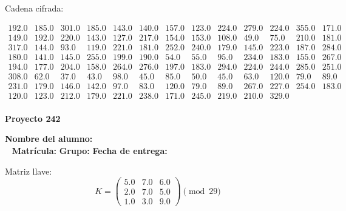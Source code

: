 \documentclass[12pt]{article}
\begin{document}
Cadena cifrada:
\begin{center}
$\begin{array}{lllllllllllll}
192.0 & 185.0 & 301.0 & 185.0 & 143.0 & 140.0 & 157.0 & 123.0 & 224.0 & 279.0 & 224.0 & 355.0 & 171.0\\
149.0 & 192.0 & 220.0 & 143.0 & 127.0 & 217.0 & 154.0 & 153.0 & 108.0 & 49.0 & 75.0 & 210.0 & 181.0\\
317.0 & 144.0 & 93.0 & 119.0 & 221.0 & 181.0 & 252.0 & 240.0 & 179.0 & 145.0 & 223.0 & 187.0 & 284.0\\
180.0 & 141.0 & 145.0 & 255.0 & 199.0 & 190.0 & 54.0 & 55.0 & 95.0 & 234.0 & 183.0 & 155.0 & 267.0\\
194.0 & 177.0 & 204.0 & 158.0 & 264.0 & 276.0 & 197.0 & 183.0 & 294.0 & 224.0 & 244.0 & 285.0 & 251.0\\
308.0 & 62.0 & 37.0 & 43.0 & 98.0 & 45.0 & 85.0 & 50.0 & 45.0 & 63.0 & 120.0 & 79.0 & 89.0\\
231.0 & 179.0 & 146.0 & 142.0 & 97.0 & 83.0 & 120.0 & 79.0 & 89.0 & 267.0 & 227.0 & 254.0 & 183.0\\
120.0 & 123.0 & 212.0 & 179.0 & 221.0 & 238.0 & 171.0 & 245.0 & 219.0 & 210.0 & 329.0\\
\end{array}$
\end{center}

\newpage


\textbf{Proyecto 242}

\textbf{Nombre del alumno:} \underline{\hspace{13cm}}\\\
\vspace{1cm}
\textbf{Matrícula:} \underline{\hspace{4cm}} \hspace{1cm}
\textbf{Grupo:} \underline{\hspace{2cm}}
\textbf{Fecha de entrega:} \underline{\hspace{2cm}}

\medskip

Matriz llave:
\[
K = \begin{pmatrix}
5.0 & 7.0 & 6.0\\
2.0 & 7.0 & 5.0\\
1.0 & 3.0 & 9.0
\end{pmatrix} \pmod{29}
\]
\end{document}
